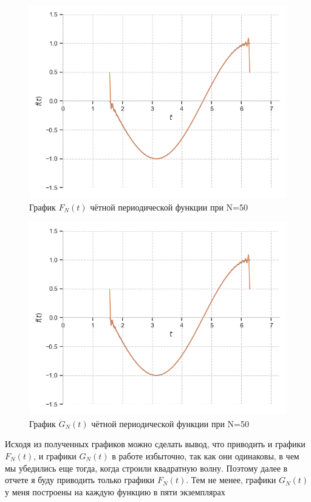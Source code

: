 \documentclass[a4paper, 16pt]{article}
\begin{document}
\begin{figure}[!htb]
    \centering
    \includegraphics[scale=0.8]{fur_cos_n=50.png}
    \captionsetup{skip=0pt}
    \caption{График $F_N(t)$ чётной периодической функции при N=50}
    \label{Рис:21}
\end{figure}
\begin{figure}[!htb]
    \centering
    \includegraphics[scale=0.8]{cfur_cos_n=50.png}
    \captionsetup{skip=0pt}
    \caption{График $G_N(t)$ чётной периодической функции при N=50}
    \label{Рис:22}
\end{figure}


\noindent Исходя из полученных графиков можно сделать вывод, что приводить
и графики $F_N(t)$, и графики $G_N(t)$ в работе избыточно, так как они одинаковы, в чем
мы убедились еще тогда, когда строили квадратную волну. Поэтому далее в отчете я
буду приводить только графики $F_N(t)$. Тем не менее, графики $G_N(t)$ у меня построены
на каждую функцию в пяти экземплярах
\end{document}
